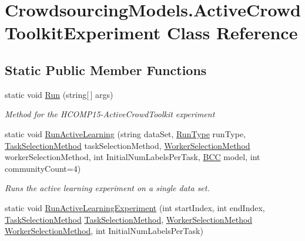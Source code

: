 \hypertarget{class_crowdsourcing_models_1_1_active_crowd_toolkit_experiment}{}\section{Crowdsourcing\+Models.\+Active\+Crowd\+Toolkit\+Experiment Class Reference}
\label{class_crowdsourcing_models_1_1_active_crowd_toolkit_experiment}
\subsection*{Static Public Member Functions}
\begin{DoxyCompactItemize}
\item 
static void \hyperlink{class_crowdsourcing_models_1_1_active_crowd_toolkit_experiment_a958016fbde8077ac87a74ba9f7e48458}{Run} (string\mbox{[}$\,$\mbox{]} args)
\begin{DoxyCompactList}\small\item\em Method for the H\+C\+O\+M\+P15-\/\+Active\+Crowd\+Toolkit experiment \end{DoxyCompactList}\item 
static void \hyperlink{class_crowdsourcing_models_1_1_active_crowd_toolkit_experiment_aca28c2bc4fc69f150b9ed428802ff078}{Run\+Active\+Learning} (string data\+Set, \hyperlink{namespace_crowdsourcing_models_ae187d0e1d9fe64e7ebcb9d948d02d2d0}{Run\+Type} run\+Type, \hyperlink{namespace_crowdsourcing_models_a1bb21d66b6c86daa36af97d919528356}{Task\+Selection\+Method} task\+Selection\+Method, \hyperlink{namespace_crowdsourcing_models_a1f0e849dc0691caa8fda0ce7778756a6}{Worker\+Selection\+Method} worker\+Selection\+Method, int Initial\+Num\+Labels\+Per\+Task, \hyperlink{class_crowdsourcing_models_1_1_b_c_c}{B\+C\+C} model, int community\+Count=4)
\begin{DoxyCompactList}\small\item\em Runs the active learning experiment on a single data set. \end{DoxyCompactList}\item 
static void \hyperlink{class_crowdsourcing_models_1_1_active_crowd_toolkit_experiment_a1c43bb1a03b9362f0111dac170a48cca}{Run\+Active\+Learning\+Experiment} (int start\+Index, int end\+Index, \hyperlink{namespace_crowdsourcing_models_a1bb21d66b6c86daa36af97d919528356}{Task\+Selection\+Method} \hyperlink{namespace_crowdsourcing_models_a1bb21d66b6c86daa36af97d919528356}{Task\+Selection\+Method}, \hyperlink{namespace_crowdsourcing_models_a1f0e849dc0691caa8fda0ce7778756a6}{Worker\+Selection\+Method} \hyperlink{namespace_crowdsourcing_models_a1f0e849dc0691caa8fda0ce7778756a6}{Worker\+Selection\+Method}, int Initial\+Num\+Labels\+Per\+Task)

\end{DoxyCompactItemize}
